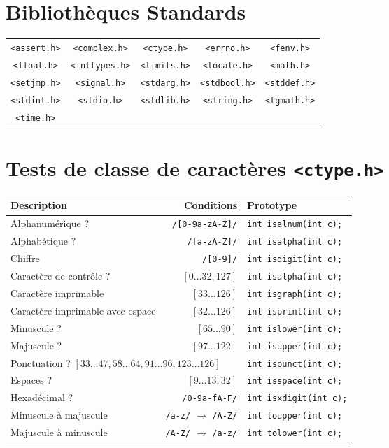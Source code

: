 \documentclass{article}
\newcommand{\cd}{\lstinline}
\begin{document}
\begin{multicols*}{3}
\section*{Bibliothèques Standards}
  \begin{tabularx}{\linewidth}{ccccc}
    \cd{<assert.h>} & \cd{<complex.h>}  & \cd{<ctype.h>}  & \cd{<errno.h>}   & \cd{<fenv.h>} \\
    \cd{<float.h>}  & \cd{<inttypes.h>} & \cd{<limits.h>} & \cd{<locale.h>}  & \cd{<math.h>} \\
    \cd{<setjmp.h>} & \cd{<signal.h>}   & \cd{<stdarg.h>} & \cd{<stdbool.h>} & \cd{<stddef.h>} \\
    \cd{<stdint.h>} & \cd{<stdio.h>}    & \cd{<stdlib.h>} & \cd{<string.h>}  & \cd{<tgmath.h>} \\
    \cd{<time.h>}   &              &            &             & \\
  \end{tabularx}

\section*{Tests de classe de caractères \texttt{<ctype.h>}}

\begin{tabularx}{\linewidth}{Xrl}
  \bf Description         & Conditions             & Prototype \\
  \hline
  Alphanumérique ?        & \texttt{/[0-9a-zA-Z]/} & \cd{int isalnum(int c);} \\
  Alphabétique ?          & \texttt{/[a-zA-Z]/} & \cd{int isalpha(int c);} \\
  Chiffre                 & \texttt{/[0-9]/} & \cd{int isdigit(int c);} \\
  Caractère de contrôle ? & \footnotesize $[0\dots32, 127]$  & \cd{int isalpha(int c);} \\
  Caractère imprimable    & \footnotesize $[33\dots 126]$ & \cd{int isgraph(int c);} \\
  Caractère imprimable avec espace & \footnotesize$[32\dots 126]$ & \cd{int isprint(int c);} \\
  Minuscule ?             & \footnotesize $[65\dots 90]$ & \cd{int islower(int c);} \\
  Majuscule ?             & \footnotesize $[97\dots 122]$ & \cd{int isupper(int c);} \\
  \multicolumn{2}{l}{Ponctuation ? \hfill\footnotesize $[33\dots 47, 58\dots64, 91\dots96, 123\dots126]$} & \cd{int ispunct(int c);} \\
  Espaces ?               & \footnotesize $[9\dots13,32]$ & \cd{int isspace(int c);} \\
  Hexadécimal ?           & \texttt{/0-9a-fA-F/} &  \cd{int isxdigit(int c);} \\
  \hline
  Minuscule à majuscule & \texttt{/a-z/} $\to$ \texttt{/A-Z/} & \cd{int toupper(int c);} \\
  Majuscule à minuscule & \texttt{/A-Z/} $\to$ \texttt{/a-z/} & \cd{int tolower(int c);} \\
\end{tabularx}


\end{multicols*}
\end{document}
